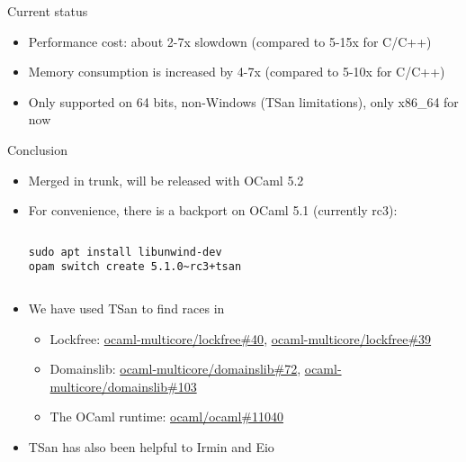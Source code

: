 \begin{frame}{Current status}
  \begin{itemize}
    \item Performance cost: about 2-7x slowdown (compared to 5-15x for C/C++)
    \item Memory consumption is increased by 4-7x (compared to 5-10x for C/C++)
    \item Only supported on 64 bits, non-Windows (TSan limitations), only x86_64 for now
  \end{itemize}
\end{frame}



\begin{frame}[fragile]{Conclusion}
  \begin{itemize}
    \item Merged in trunk, will be released with OCaml 5.2
    \item For convenience, there is a backport on OCaml 5.1 (currently rc3):
      \begin{columns}
        \begin{column}{0.5\textwidth}
          \lstset{basicstyle=\ttfamily\small}
          \begin{lstlisting}
sudo apt install libunwind-dev
opam switch create 5.1.0~rc3+tsan
          \end{lstlisting}
        \end{column}
      \end{columns}
      \vspace*{-7pt}
    \item We have used TSan to find races in
      \begin{itemize}
        \item Lockfree:
          \href{https://github.com/ocaml-multicore/lockfree/pull/40}{ocaml-multicore/lockfree\#40},
          \href{https://github.com/ocaml-multicore/lockfree/issues/39}{ocaml-multicore/lockfree\#39}
        \item Domainslib:
          \href{https://github.com/ocaml-multicore/domainslib/issues/72}{ocaml-multicore/domainslib\#72},
          \href{https://github.com/ocaml-multicore/domainslib/pull/103}{ocaml-multicore/domainslib\#103}
        \item The OCaml runtime:
          \href{https://github.com/ocaml/ocaml/issues/11040}{ocaml/ocaml\#11040}
      \end{itemize}
    \item TSan has also been helpful to Irmin and Eio

\end{itemize}
\end{frame}
